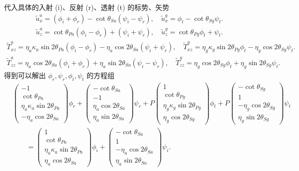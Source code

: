 代入具体的入射 (i)、反射 (r)、透射 (t) 的标势、矢势
\begin{align*}
	\tilde{u}_x^a = (\phi_i + \phi_r) - \cot\theta_{Sa} (\psi_i - \psi_r), \quad \tilde{u}_x^g = \phi_t - \cot\theta_{Sg} \psi_t.
\end{align*}
\begin{align*}
	\tilde{u}_z^a = \cot\theta_{Pa} (\phi_i - \phi_r) + (\psi_i + \psi_r), \quad \tilde{u}_z^g = \cot\theta_{Pg} \phi_t + \psi_t.
\end{align*}
\begin{align*}
	\tilde{T}_{xz}^a = \eta_a \kappa_a \sin2\theta_{Pa} (\phi_i - \phi_r) - \eta_a \cos2\theta_{Sa} (\psi_i + \psi_r), \quad \tilde{T}_{xz}^g = \eta_g \kappa_g \sin2\theta_{Pg} \phi_t - \eta_g \cos2\theta_{Sg} \psi_t.
\end{align*}
\begin{align*}
	\tilde{T}_{zz}^a = \eta_a \cos2\theta_{Sa} (\phi_i + \phi_r) + \eta_a \sin2\theta_{Sa} (\psi_i - \psi_r), \quad \tilde{T}_{zz}^g = \eta_g \cos2\theta_{Sg} \phi_t + \eta_g \sin2\theta_{Sg} \psi_t.
\end{align*}
得到可以解出 \(\phi_r, \psi_r, \phi_t, \psi_t\) 的方程组
\begin{align*}
	&\begin{pmatrix} -1 \\ \cot\theta_{Pa} \\ \eta_a \kappa_a \sin2\theta_{Pa} \\ -\eta_a \cos2\theta_{Sa} \end{pmatrix} \phi_r +
	\begin{pmatrix} -\cot\theta_{Sa} \\ -1 \\ \eta_a \cos2\theta_{Sa} \\ \eta_a \sin2\theta_{Sa} \end{pmatrix} \psi_r +
	P \begin{pmatrix} 1 \\ \cot\theta_{Pg} \\ \eta_g \kappa_g \sin2\theta_{Pg} \\ \eta_g \cos2\theta_{Sg} \end{pmatrix} \phi_t +
	P \begin{pmatrix} -\cot\theta_{Sg} \\ 1 \\ -\eta_g \cos2\theta_{Sg} \\ \eta_g \sin2\theta_{Sg} \end{pmatrix} \psi_t \\&\qquad=
	\begin{pmatrix} 1 \\ \cot\theta_{Pa} \\ \eta_a \kappa_a \sin2\theta_{Pa} \\ \eta_a \cos2\theta_{Sa} \end{pmatrix} \phi_i +
	\begin{pmatrix} -\cot\theta_{Sa} \\ 1 \\ -\eta_a \cos2\theta_{Sa} \\ \eta_a \sin2\theta_{Sa} \end{pmatrix} \psi_i.
\end{align*}

